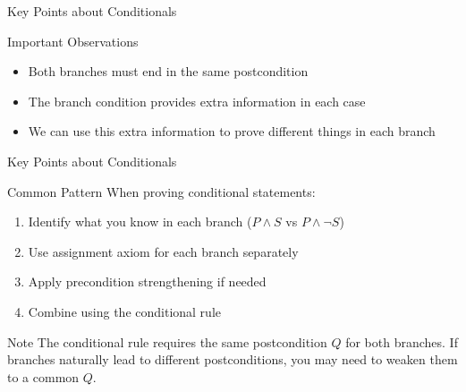 \begin{frame}{Key Points about Conditionals}
    \begin{block}{Important Observations}
        \begin{itemize}
            \item Both branches must end in the same postcondition
            \item The branch condition provides extra information in each case
            \item We can use this extra information to prove different things in each branch
        \end{itemize}
    \end{block}
\end{frame}
\begin{frame}{Key Points about Conditionals}

    \begin{block}{Common Pattern}
        When proving conditional statements:
        \begin{enumerate}
            \item Identify what you know in each branch ($P \wedge S$ vs $P \wedge \neg S$)
            \item Use assignment axiom for each branch separately
            \item Apply precondition strengthening if needed
            \item Combine using the conditional rule
        \end{enumerate}
    \end{block}
    
    \begin{alertblock}{Note}
        The conditional rule requires the same postcondition $Q$ for both branches. If branches naturally lead to different postconditions, you may need to weaken them to a common $Q$.
    \end{alertblock}
\end{frame}
